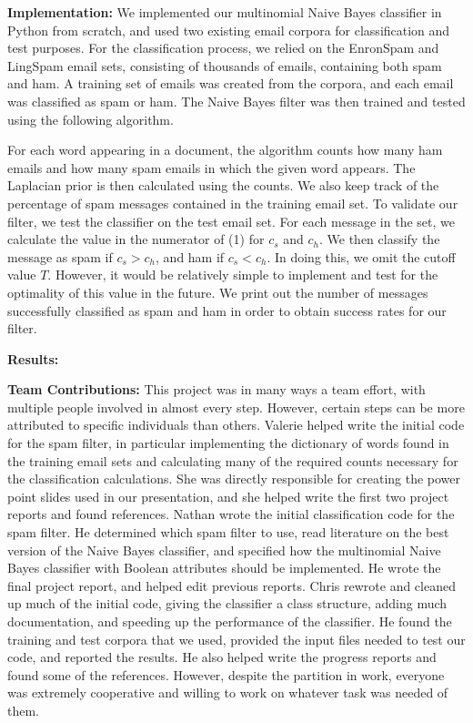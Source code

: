 \documentclass[12pt]{article}
\begin{document}
 \textbf{Implementation:}  We implemented our multinomial Naive Bayes classifier in Python from 
 scratch, and used two existing email corpora for classification and test purposes. For the 
 classification process, we relied on the EnronSpam and LingSpam email sets, consisting of 
 thousands of emails, containing both spam and ham.  A training set of emails was created
 from the corpora, and each email was classified as spam or ham.  The Naive Bayes filter was 
 then trained and tested using the following algorithm.
 
 For each word appearing in a document, the algorithm counts how many ham emails and how many
 spam emails in which the given word appears.  The Laplacian prior is then calculated using the 
 counts.  We also keep track of the percentage of spam messages contained in the training email set.
 To validate our filter, we test the classifier on the test email set.  For each message in the set, we
 calculate the value in the numerator of (1) for $c_s$ and $c_h$.  We then classify the message
 as spam if $c_s > c_h$, and ham if $c_s < c_h$.  In doing this, we omit the cutoff value $T$. 
 However, it would be relatively simple to implement and test for the optimality of this value in the future.
 We print out the number of messages successfully classified as spam and ham in order to obtain
 success rates for our filter.
 
 \textbf{Results:}  
 
 \textbf{Team Contributions:} This project was in many ways a team effort, with multiple people
 involved in almost every step.  However, certain steps can be more attributed to specific individuals
 than others.  Valerie helped write the initial code for the spam filter, in particular implementing the 
 dictionary of words found in the training email sets and calculating many of the required counts 
 necessary for the classification calculations.  She was directly responsible for creating the power
 point slides used in our presentation, and she helped write the first two project reports and found
 references.  Nathan wrote the initial classification code for the spam filter.  He determined which
 spam filter to use, read literature on the best version of the Naive Bayes classifier, and 
 specified how the multinomial Naive Bayes classifier with Boolean attributes should be implemented.
 He wrote the final project report, and helped edit previous reports.  Chris rewrote and cleaned up
 much of the initial code, giving the classifier a class structure, adding much documentation, and 
 speeding up the performance of the classifier.  He found the training and test corpora that we used,
 provided the input files needed to test our code, and reported the results.  He also helped write the 
 progress reports and found some of the references.  However, despite the partition in work, everyone
 was extremely cooperative and willing to work on whatever task was needed of them.
\end{document}
